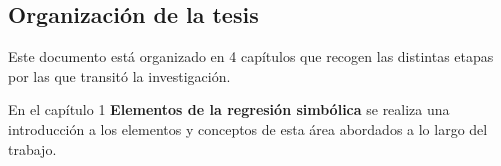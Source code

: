 \subsection*{Organización de la tesis}

Este documento está organizado en 4 capítulos que recogen las
distintas etapas por las que transitó la investigación.

En el capítulo 1 \textbf{Elementos de la regresión simbólica} se realiza una
introducción a los elementos y conceptos de esta área abordados a lo largo
del trabajo.
